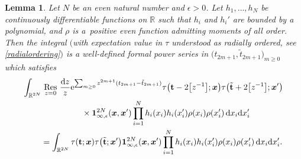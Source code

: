 \documentclass[pdftex]{sigma}
\numberwithin{equation}{section}
\newcommand{\dd}{\mathrm{d}}
\newcommand{\Res}{\mathop{\,\rm Res\,}}
\newtheorem{Lemma}[Theorem]{Lemma}
\begin{document}
\begin{Lemma}
\label{thm:BKPlem}
Let $N$ be an even natural number and $\epsilon >0$. Let
$h_1,\dots,h_N$ be continuously differentiable functions on $\mathbb{R}$
such that $h_i$ and $h_i'$ are bounded by a
polynomial, and $\rho$ is a~positive even function admitting moments
of all order. Then the integral $($with expectation value in $\tau$
understood as radially ordered, see \eqref{radialordering}$)$ is a
well-defined formal power series in
$\bigl(t_{2m+1},\tilde{t}_{2m + 1}\bigr)_{m \geq 0}$ which satisfies
\begin{gather*}
 \int_{\mathbb{R}^{2N}} \Res_{z = 0} \frac{\dd z}{z}
{\rm e}^{\sum_{m \geq 0} z^{2m+1}(t_{2m+1}-\tilde{t}_{2m+1})} \tau\bigl(\mathbf{t} - 2\bigl[z^{-1}\bigr];\boldsymbol{x}\bigr) \tau\bigl(\tilde{\mathbf{t}} + 2\bigl[z^{-1}\bigr];\boldsymbol{x}'\bigr) \\
 \qquad\quad{} \times \mathbf{1}_{\infty,\epsilon}^{2N}(\boldsymbol{x},\boldsymbol{x}') \prod_{i = 1}^{N} h_i(x_i)h_i(x_i')\rho(x_i)\rho(x_i') \, \dd x_i \dd x_i' \\
\qquad {}= \int_{\mathbb{R}^{2N}} \tau(\mathbf{t};\boldsymbol{x}) \tau\bigl(\tilde{\mathbf{t}};\boldsymbol{x}'\bigr)\mathbf{1}_{\infty,\epsilon}^{2N}(\boldsymbol{x},\boldsymbol{x}') \prod_{i = 1}^{N} h_i(x_i)h_i(x_i') \rho(x_i)\rho(x_i')\,\dd x_i \dd x_i'.
\end{gather*}
\end{Lemma}
\end{document}
